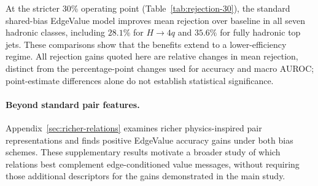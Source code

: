 At the stricter 30\% operating point
(Table~\ref{tab:rejection-30}), the standard shared-bias EdgeValue
model improves mean rejection over baseline in all seven hadronic classes,
including $28.1\%$ for $H\to4q$ and $35.6\%$ for fully hadronic top jets.
These comparisons show that the benefits extend to a lower-efficiency regime.
All rejection gains quoted here are relative changes in mean rejection,
distinct from the percentage-point changes used for accuracy and macro
AUROC; point-estimate differences alone do not establish statistical
significance.

\paragraph{Beyond standard pair features.}
Appendix~\ref{sec:richer-relations} examines richer physics-inspired pair
representations and finds positive EdgeValue accuracy gains under both bias
schemes. These supplementary results motivate a broader study of which
relations best complement edge-conditioned value messages, without requiring
those additional descriptors for the gains demonstrated in the main study.
